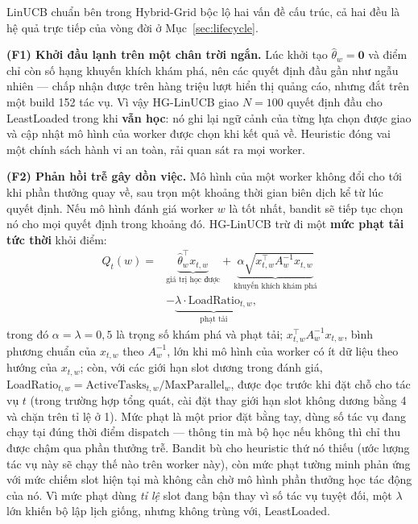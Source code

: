 \documentclass[final,5p,times,twocolumn]{elsarticle}
\begin{document}
LinUCB chuẩn bên trong Hybrid-Grid bộc lộ hai vấn đề cấu trúc, cả hai đều là hệ quả trực tiếp của vòng đời ở Mục~\ref{sec:lifecycle}.

\textbf{(F1) Khởi đầu lạnh trên một chân trời ngắn.} Lúc khởi tạo $\hat\theta_w=\mathbf{0}$ và điểm chỉ còn số hạng khuyến khích khám phá, nên các quyết định đầu gần như ngẫu nhiên --- chấp nhận được trên hàng triệu lượt hiển thị quảng cáo, nhưng đắt trên một build 152 tác vụ. Vì vậy HG-LinUCB giao $N=100$ quyết định đầu cho LeastLoaded trong khi \textbf{vẫn học}: nó ghi lại ngữ cảnh của từng lựa chọn được giao và cập nhật mô hình của worker được chọn khi kết quả về. Heuristic đóng vai một chính sách hành vi an toàn, rải quan sát ra mọi worker.

\textbf{(F2) Phản hồi trễ gây dồn việc.} Mô hình của một worker không đổi cho tới khi phần thưởng quay về, sau trọn một khoảng thời gian biên dịch kể từ lúc quyết định. Nếu mô hình đánh giá worker $w$ là tốt nhất, bandit sẽ tiếp tục chọn nó cho mọi quyết định trong khoảng đó. HG-LinUCB trừ đi một \textbf{mức phạt tải tức thời} khỏi điểm:
\begin{equation}
\begin{split}
Q_t(w)={}&\underbrace{\hat{\theta}_w^\top x_{t,w}}_{\text{giá trị học được}}+\underbrace{\alpha\sqrt{x_{t,w}^\top A_w^{-1}x_{t,w}}}_{\text{khuyến khích khám phá}}\\
&-\underbrace{\lambda\cdot\text{LoadRatio}_{t,w}}_{\text{phạt tải}},
\end{split}
\end{equation}
trong đó $\alpha=\lambda=0{,}5$ là trọng số khám phá và phạt tải; $x_{t,w}^\top A_w^{-1}x_{t,w}$, bình phương chuẩn của $x_{t,w}$ theo $A_w^{-1}$, lớn khi mô hình của worker có ít dữ liệu theo hướng của $x_{t,w}$; còn, với các giới hạn slot dương trong đánh giá, $\text{LoadRatio}_{t,w}=\text{ActiveTasks}_{t,w}/\text{MaxParallel}_w$, được đọc trước khi đặt chỗ cho tác vụ $t$ (trong trường hợp tổng quát, cài đặt thay giới hạn slot không dương bằng 4 và chặn trên tỉ lệ ở 1). Mức phạt là một prior đặt bằng tay, dùng số tác vụ đang chạy tại đúng thời điểm dispatch --- thông tin mà bộ học nếu không thì chỉ thu được chậm qua phần thưởng trễ. Bandit bù cho heuristic thứ nó thiếu (ước lượng tác vụ này sẽ chạy thế nào trên worker này), còn mức phạt tường minh phản ứng với mức chiếm slot hiện tại mà không cần chờ mô hình phần thưởng học tác động của nó. Vì mức phạt dùng \emph{tỉ lệ} slot đang bận thay vì số tác vụ tuyệt đối, một $\lambda$ lớn khiến bộ lập lịch giống, nhưng không trùng với, LeastLoaded.
\end{document}
